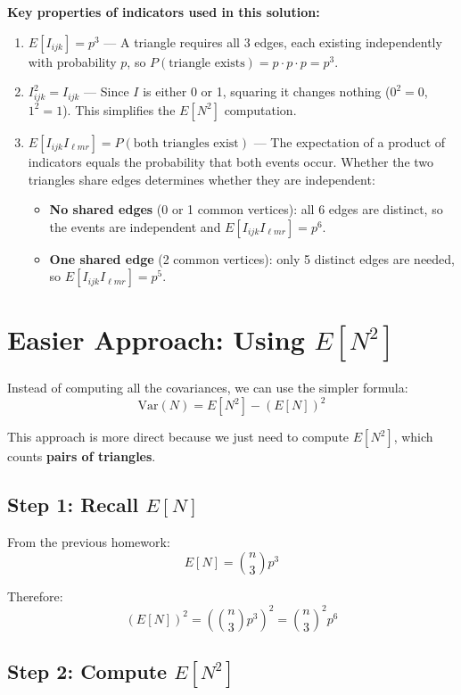 \documentclass[11pt]{article}
\begin{document}
\textbf{Key properties of indicators used in this solution:}
\begin{enumerate}[leftmargin=2em]
    \item $E[I_{ijk}] = p^3$ --- A triangle requires all 3 edges, each existing independently with probability $p$, so $P(\text{triangle exists}) = p \cdot p \cdot p = p^3$.

    \item $I_{ijk}^2 = I_{ijk}$ --- Since $I$ is either 0 or 1, squaring it changes nothing ($0^2 = 0$, $1^2 = 1$). This simplifies the $E[N^2]$ computation.

    \item $E[I_{ijk} I_{\ell mr}] = P(\text{both triangles exist})$ --- The expectation of a product of indicators equals the probability that both events occur. Whether the two triangles share edges determines whether they are independent:
    \begin{itemize}[leftmargin=2em]
        \item \textbf{No shared edges} (0 or 1 common vertices): all 6 edges are distinct, so the events are independent and $E[I_{ijk} I_{\ell mr}] = p^6$.
        \item \textbf{One shared edge} (2 common vertices): only 5 distinct edges are needed, so $E[I_{ijk} I_{\ell mr}] = p^5$.
    \end{itemize}
\end{enumerate}

\bigskip

\section*{Easier Approach: Using $E[N^2]$}

Instead of computing all the covariances, we can use the simpler formula:
\[
\text{Var}(N) = E[N^2] - (E[N])^2
\]

This approach is more direct because we just need to compute $E[N^2]$, which counts \textbf{pairs of triangles}.

\subsection*{Step 1: Recall $E[N]$}

From the previous homework:
\[
E[N] = \binom{n}{3} p^3
\]

Therefore:
\[
(E[N])^2 = \left(\binom{n}{3} p^3\right)^2 = \binom{n}{3}^2 p^6
\]

\subsection*{Step 2: Compute $E[N^2]$}
\end{document}
